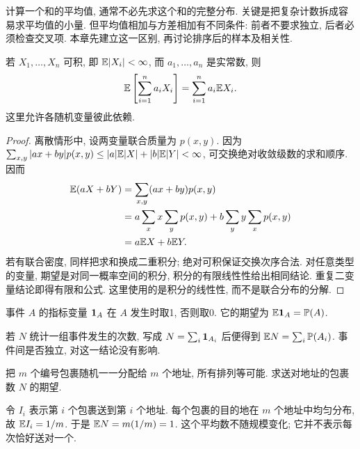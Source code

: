 计算一个和的平均值, 通常不必先求这个和的完整分布. 关键是把复杂计数拆成容易求平均值的小量. 但平均值相加与方差相加有不同条件: 前者不要求独立, 后者必须检查交叉项. 本章先建立这一区别, 再讨论排序后的样本及相关性.

\begin{theorem}[线性性]
若 $X_1,\ldots,X_n$ 可积, 即 $\mathbb E|X_i|<\infty$, 而 $a_1,\ldots,a_n$ 是实常数, 则
\[\mathbb E\left[\sum_{i=1}^n a_iX_i\right]=\sum_{i=1}^n a_i\mathbb E X_i.\]
这里允许各随机变量彼此依赖.
\end{theorem}
\begin{proof}
离散情形中, 设两变量联合质量为 $p(x,y)$. 因为
$\sum_{x,y}|ax+by|p(x,y)\le |a|\mathbb E|X|+|b|\mathbb E|Y|<\infty$, 可交换绝对收敛级数的求和顺序. 因而
\[
\begin{aligned}
\mathbb E(aX+bY)&=\sum_{x,y}(ax+by)p(x,y)\\
&=a\sum_x x\sum_y p(x,y)+b\sum_y y\sum_x p(x,y)\\
&=a\mathbb E X+b\mathbb E Y.
\end{aligned}
\]
若有联合密度, 同样把求和换成二重积分; 绝对可积保证交换次序合法. 对任意类型的变量, 期望是对同一概率空间的积分, 积分的有限线性性给出相同结论. 重复二变量结论即得有限和公式. 这里使用的是积分的线性性, 而不是联合分布的分解.
\end{proof}

\begin{definition}[指标变量]
事件 $A$ 的指标变量 $\mathbf 1_A$ 在 $A$ 发生时取1, 否则取0. 它的期望为 $\mathbb E\mathbf 1_A=\mathbb P(A)$.
\end{definition}
若 $N$ 统计一组事件发生的次数, 写成 $N=\sum_i\mathbf 1_{A_i}$ 后便得到 $\mathbb E N=\sum_i\mathbb P(A_i)$. 事件间是否独立, 对这一结论没有影响.
\begin{example}
把 $m$ 个编号包裹随机一一分配给 $m$ 个地址, 所有排列等可能. 求送对地址的包裹数 $N$ 的期望.
\end{example}
\begin{solution}
令 $I_i$ 表示第 $i$ 个包裹送到第 $i$ 个地址. 每个包裹的目的地在 $m$ 个地址中均匀分布, 故 $\mathbb E I_i=1/m$. 于是 $\mathbb E N=m(1/m)=1$. 这个平均数不随规模变化; 它并不表示每次恰好送对一个.
\end{solution}

